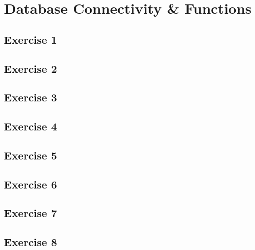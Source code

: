 \chapter{Database Connectivity \& Functions}

\section{Exercise 1}
\section{Exercise 2}
\section{Exercise 3}
\section{Exercise 4}
\section{Exercise 5}
\section{Exercise 6}
\section{Exercise 7}
\section{Exercise 8}
